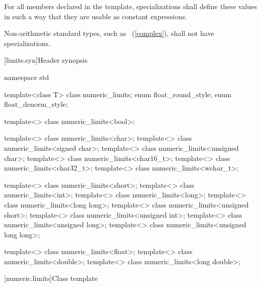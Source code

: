 \pnum
For all members declared
 
in the
template, specializations shall define these values in such a way
that they are usable as
constant expressions.

\pnum
Non-arithmetic standard types, such as
~(\ref{complex}), shall not have specializations.

[limits.syn]{Header  synopsis}
%
%
%
%
%
%

\begin{codeblock}
namespace std {
  template<class T> class numeric_limits;
  enum float_round_style;
  enum float_denorm_style;

  template<> class numeric_limits<bool>;

  template<> class numeric_limits<char>;
  template<> class numeric_limits<signed char>;
  template<> class numeric_limits<unsigned char>;
  template<> class numeric_limits<char16_t>;
  template<> class numeric_limits<char32_t>;
  template<> class numeric_limits<wchar_t>;

  template<> class numeric_limits<short>;
  template<> class numeric_limits<int>;
  template<> class numeric_limits<long>;
  template<> class numeric_limits<long long>;
  template<> class numeric_limits<unsigned short>;
  template<> class numeric_limits<unsigned int>;
  template<> class numeric_limits<unsigned long>;
  template<> class numeric_limits<unsigned long long>;

  template<> class numeric_limits<float>;
  template<> class numeric_limits<double>;
  template<> class numeric_limits<long double>;
}
\end{codeblock}

[numeric.limits]{Class template }

